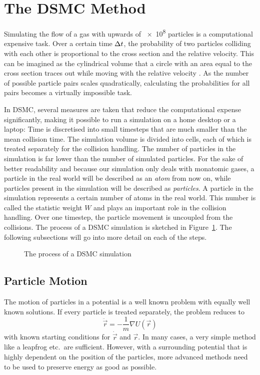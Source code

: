 \section{The DSMC Method}
Simulating the flow of a gas with upwards of \num{e8} particles is a computational expensive task. Over a certain time $\Delta t$, the probability of two particles colliding with each other is proportional to the cross section and the relative velocity. This can be imagined as the cylindrical volume that a circle with an area equal to the cross section traces out while moving with the relative velocity \cite[7]{bird1994}. As the number of possible particle pairs scales quadratically, calculating the probabilities for all pairs becomes a virtually impossible task. 

In DSMC, several measures are taken that reduce the computational expense significantly, making it possible to run a simulation on a home desktop or a laptop:
Time is discretised into small timesteps that are much smaller than the mean collision time. The simulation volume is divided into cells, each of which is treated separately for the collision handling. The number of particles in the simulation is far lower than the number of simulated particles. For the sake of better readability and because our simulation only deals with monatomic gases, a particle in the real world will be described as an \emph{atom} from now on, while particles present in the simulation will be described as \emph{particles}. A particle in the simulation represents a certain number of atoms in the real world. This number is called the statistic weight $W$ and plays an important role in the collision handling. Over one timestep, the particle movement is uncoupled from the collisions. The process of a DSMC simulation is sketched in Figure~\ref{fig:dsmc_flowchart}. The following subsections will go into more detail on each of the steps.
\begin{figure}[htbp]
    \centering
    
    \caption{The process of a DSMC simulation}
    \label{fig:dsmc_flowchart}
\end{figure}


\subsection{Particle Motion}
The motion of particles in a potential is a well known problem with equally well known solutions. If every particle is treated separately, the problem reduces to
\begin{equation*}
    \ddot{\vec{r}} = -\frac{1}{m}\nabla U(\vec{r})
\end{equation*}
with known starting conditions for $\dot{\vec{r}}$ and $\vec{r}$. In many cases, a very simple method like a leapfrog etc.\ are sufficient. However, with a surrounding potential that is highly dependent on the position of the particles, more advanced methods need to be used to preserve energy as good as possible.

